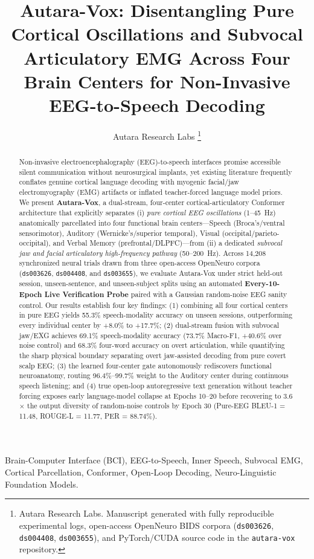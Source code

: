 \documentclass[journal]{IEEEtran}
\title{Autara-Vox: Disentangling Pure Cortical Oscillations and Subvocal Articulatory EMG Across Four Brain Centers for Non-Invasive EEG-to-Speech Decoding}
\author{Autara Research Labs%
\thanks{Autara Research Labs. Manuscript generated with fully reproducible experimental logs, open-access OpenNeuro BIDS corpora (\texttt{ds003626}, \texttt{ds004408}, \texttt{ds003655}), and PyTorch/CUDA source code in the \texttt{autara-vox} repository.}}
\begin{document}
\maketitle

\begin{abstract}
Non-invasive electroencephalography (EEG)-to-speech interfaces promise accessible silent communication without neurosurgical implants, yet existing literature frequently conflates genuine cortical language decoding with myogenic facial/jaw electromyography (EMG) artifacts or inflated teacher-forced language model priors. We present \textbf{Autara-Vox}, a dual-stream, four-center cortical-articulatory Conformer architecture that explicitly separates (i) \emph{pure cortical EEG oscillations} (1--45~Hz) anatomically parcellated into four functional brain centers---Speech (Broca's/ventral sensorimotor), Auditory (Wernicke's/superior temporal), Visual (occipital/parieto-occipital), and Verbal Memory (prefrontal/DLPFC)---from (ii) a dedicated \emph{subvocal jaw and facial articulatory high-frequency pathway} (50--200~Hz). Across 14,208 synchronized neural trials drawn from three open-access OpenNeuro corpora (\texttt{ds003626}, \texttt{ds004408}, and \texttt{ds003655}), we evaluate Autara-Vox under strict held-out session, unseen-sentence, and unseen-subject splits using an automated \textbf{Every-10-Epoch Live Verification Probe} paired with a Gaussian random-noise EEG sanity control. Our results establish four key findings: (1) combining all four cortical centers in pure EEG yields 55.3\% speech-modality accuracy on unseen sessions, outperforming every individual center by +8.0\% to +17.7\%; (2) dual-stream fusion with subvocal jaw/EXG achieves 69.1\% speech-modality accuracy (73.7\% Macro-F1, +40.6\% over noise control) and 68.3\% four-word accuracy on overt articulation, while quantifying the sharp physical boundary separating overt jaw-assisted decoding from pure covert scalp EEG; (3) the learned four-center gate autonomously rediscovers functional neuroanatomy, routing 96.4\%--99.7\% weight to the Auditory center during continuous speech listening; and (4) true open-loop autoregressive text generation without teacher forcing exposes early language-model collapse at Epochs 10--20 before recovering to 3.6$\times$ the output diversity of random-noise controls by Epoch 30 (Pure-EEG BLEU-1 = 11.48, ROUGE-L = 11.77, PER = 88.74\%).
\end{abstract}

\begin{IEEEkeywords}
Brain-Computer Interface (BCI), EEG-to-Speech, Inner Speech, Subvocal EMG, Cortical Parcellation, Conformer, Open-Loop Decoding, Neuro-Linguistic Foundation Models.
\end{IEEEkeywords}
\end{document}
